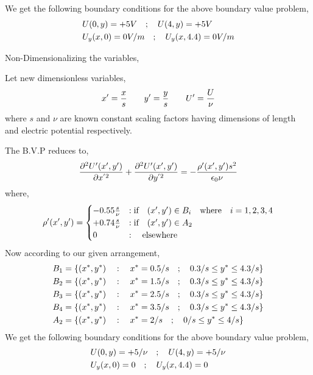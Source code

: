 We get the following boundary conditions for the above boundary value problem,
\begin{align}
    & U(0,y) = +5 V \hspace{0.35cm}; \hspace{0.35cm} U(4,y) = +5 V \\ 
    & U_y(x,0) = 0V/m \hspace{0.35cm}; \hspace{0.35cm} U_y(x,4.4) = 0V/m 
\end{align}

Non-Dimensionalizing the variables,

Let new dimensionless variables,
\begin{align}
    x' = \frac{x}{s} \gs \gs y' = \frac{y}{s} \gs \gs U' = \frac{U}{\nu}
\end{align}
where $s$ and $\nu$ are known constant scaling factors having dimensions of length and electric potential respectively.

The B.V.P reduces to,
\begin{equation}
    \frac{\partial^2U'(x',y') }{\partial x^{'2}} + \frac{\partial^2U'(x',y') }{\partial y^{'2}}= -\frac{\rho'(x',y') s^2}{\epsilon_0 \nu} \\
\end{equation}
where,
\begin{equation}
\rho'(x',y') =  \begin{cases}
    -0.55\frac{s}{\nu}  & :\text{if} \hspace{0.35cm} (x',y') \in B_i \hspace{0.35cm} \text{where} \hspace{0.35cm} i = 1,2,3,4 \\
    +0.74\frac{s}{\nu} & :\text{if} \hspace{0.35cm} (x',y') \in A_2  \\
    0  & : \hspace{0.35cm} \text{elsewhere} \\
\end{cases}
\end{equation}
Now according to our given arrangement,
\begin{align}
    B_1 &= \{ (x^*,y^*) \hspace{0.35cm} : \hspace{0.35cm} x^*= 0.5/s \hspace{0.35cm};\hspace{0.35cm} 0.3/s \leq y^* \leq 4.3/s \} \\
    B_2 &= \{ (x^*,y^*) \hspace{0.35cm} : \hspace{0.35cm} x^*= 1.5/s \hspace{0.35cm};\hspace{0.35cm} 0.3/s \leq y^* \leq 4.3/s \} \\
    B_3 &= \{ (x^*,y^*) \hspace{0.35cm} : \hspace{0.35cm} x^*= 2.5/s \hspace{0.35cm};\hspace{0.35cm} 0.3/s \leq y^* \leq 4.3/s \} \\
    B_4 &= \{ (x^*,y^*) \hspace{0.35cm} : \hspace{0.35cm} x^*= 3.5/s \hspace{0.35cm};\hspace{0.35cm} 0.3/s \leq y^* \leq 4.3/s \} \\
    A_2 &= \{ (x^*,y^*) \hspace{0.35cm} : \hspace{0.35cm} x^*= 2/s \hspace{0.35cm};\hspace{0.35cm} 0/s \leq y^* \leq 4/s \} 
\end{align}
We get the following boundary conditions for the above boundary value problem,
\begin{align}
    & U(0,y) = +5/\nu \hspace{0.35cm}; \hspace{0.35cm} U(4,y) = +5/\nu \\ 
    & U_y(x,0) = 0 \hspace{0.35cm}; \hspace{0.35cm} U_y(x,4.4) = 0 
\end{align}